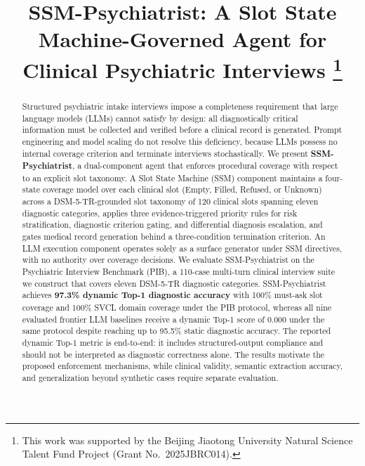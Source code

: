 \documentclass[conference]{IEEEtran}
\begin{document}
\title{SSM-Psychiatrist: A Slot State Machine-Governed Agent for Clinical Psychiatric Interviews%
\thanks{This work was supported by the Beijing Jiaotong University Natural Science Talent Fund Project (Grant No.~2025JBRC014).}}

\author{
}

\maketitle

\begin{abstract}
Structured psychiatric intake interviews impose a completeness
requirement that large language models (LLMs) cannot satisfy by design:
all diagnostically critical information must be collected and verified
before a clinical record is generated. Prompt engineering and model
scaling do not resolve this deficiency, because LLMs possess no
internal coverage criterion and terminate interviews stochastically. We
present \textbf{SSM-Psychiatrist}, a dual-component agent that enforces
procedural coverage with respect to an explicit slot taxonomy. A Slot State Machine (SSM)
component maintains a four-state coverage model over each clinical slot
(Empty, Filled, Refused, or Unknown) across a DSM-5-TR-grounded slot
taxonomy of 120 clinical slots spanning eleven diagnostic categories,
applies three evidence-triggered priority rules for risk
stratification, diagnostic criterion gating, and differential diagnosis
escalation, and gates medical record generation behind a three-condition termination criterion. An LLM execution
component operates solely as a surface generator under SSM directives,
with no authority over coverage decisions. We evaluate SSM-Psychiatrist
on the Psychiatric Interview Benchmark (PIB), a 110-case multi-turn
clinical interview suite we construct that covers eleven DSM-5-TR
diagnostic categories. SSM-Psychiatrist achieves \textbf{97.3\% dynamic
Top-1 diagnostic accuracy} with 100\% must-ask slot coverage and 100\%
SVCL domain coverage under the PIB protocol, whereas all nine evaluated
frontier LLM baselines receive a dynamic Top-1 score of 0.000 under the
same protocol despite reaching up to 95.5\% static diagnostic accuracy.
The reported dynamic Top-1 metric is end-to-end: it includes
structured-output compliance and should not be interpreted as diagnostic
correctness alone. The results motivate the proposed enforcement
mechanisms, while clinical validity, semantic extraction accuracy, and
generalization beyond synthetic cases require separate evaluation.
\end{abstract} 
\end{document}
